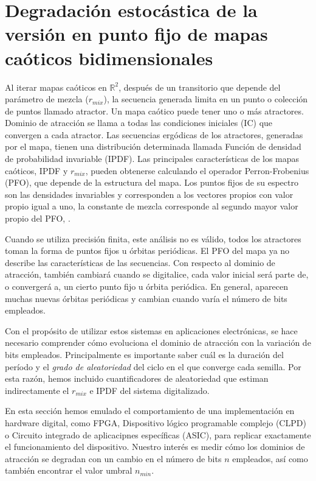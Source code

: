 \section{Degradación estocástica de la versión en punto fijo de mapas caóticos bidimensionales}
\label{sec:StochDegr}

Al iterar mapas caóticos en $\mathbb{R} ^ 2 $, después de un transitorio que depende del parámetro de mezcla ($r_{mix}$), la secuencia generada limita en un punto o colección de puntos llamado atractor.
Un mapa caótico puede tener uno o más atractores.
Dominio de atracción se llama a todas las condiciones iniciales (IC) que convergen a cada atractor.
Las secuencias ergódicas de los atractores, generadas por el mapa, tienen una distribución determinada llamada Función de densidad de probabilidad invariable (IPDF).
Las principales características de los mapas caóticos, IPDF y $r_{mix}$, pueden obtenerse calculando el operador Perron-Frobenius (PFO), que depende de la estructura del mapa.
Los puntos fijos de su espectro son las densidades invariables y corresponden a los vectores propios con valor propio igual a uno, la constante de mezcla corresponde al segundo mayor valor propio del PFO, \cite{Lasota1994, Lasota1973}.

Cuando se utiliza precisión finita, este análisis no es válido, todos los atractores toman la forma de puntos fijos u órbitas periódicas.
El PFO del mapa ya no describe las características de las secuencias.
Con respecto al dominio de atracción, también cambiará cuando se digitalice, cada valor inicial será parte de, o convergerá a, un cierto punto fijo u órbita periódica.
En general, aparecen muchas nuevas órbitas periódicas y cambian cuando varía el número de bits empleados.

Con el propósito de utilizar estos sistemas en aplicaciones electrónicas, se hace necesario comprender cómo evoluciona el dominio de atracción con la variación de bits empleados.
Principalmente es importante saber cuál es la duración del período y el \textsl{grado de aleatoriedad} del ciclo en el que converge cada semilla.
Por esta razón, hemos incluido cuantificadores de aleatoriedad que estiman indirectamente el $r_{mix}$ e IPDF del sistema digitalizado.

En esta sección hemos emulado el comportamiento de una implementación en hardware digital, como FPGA, Dispositivo lógico programable complejo (CLPD) o Circuito integrado de aplicacipnes específicas (ASIC), para replicar exactamente el funcionamiento del dispositivo.
Nuestro interés es medir cómo los dominios de atracción se degradan con un cambio en el número de bits $n$ empleados, así como también encontrar el valor umbral
$n_{min}$.

